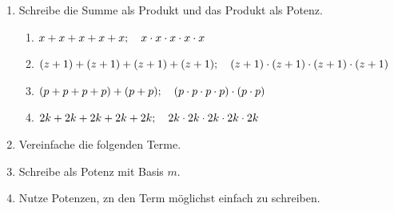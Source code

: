 \documentclass[11pt,oneside]{article}
\begin{document}
    \begin{aufgabe} %
        \begin{enumerate}
        	\item Schreibe die Summe als Produkt und das Produkt als Potenz.
        	\begin{enumerate}[label=\alph*)]
        		\item $x+x+x+x+x; \quad x\cdot x\cdot x\cdot x\cdot x$
        		\item $(z+1)+(z+1)+(z+1)+(z+1); \quad (z+1)\cdot(z+1)\cdot(z+1)\cdot(z+1)$
        		\item $(p+p+p+p)+(p+p);\quad (p\cdot p\cdot p\cdot p)\cdot(p\cdot p)$
        		\item $2k+2k+2k+2k+2k;\quad 2k\cdot2k\cdot2k\cdot2k\cdot2k$
        	\end{enumerate}
            \item Vereinfache die folgenden Terme.
            \newpage
            \item Schreibe als Potenz mit Basis $m$.
            \item Nutze Potenzen, zn den Term möglichst einfach zu schreiben.
\end{enumerate}
\end{aufgabe}
\end{document}
